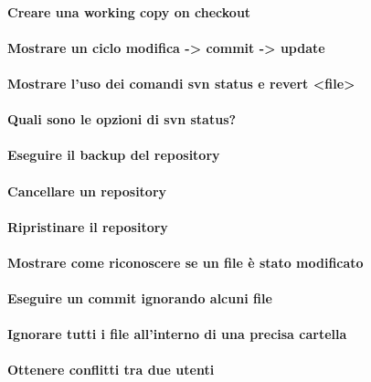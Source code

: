 \documentclass[a4paper]{article}
\begin{document}
	\paragraph{Creare una working copy on checkout}
	
	\paragraph{Mostrare un ciclo modifica -> commit -> update}
	
	\paragraph{Mostrare l'uso dei comandi svn status e revert <file>}
	
	\paragraph{Quali sono le opzioni di svn status?}
	
	\paragraph{Eseguire il backup del repository}
	
	\paragraph{Cancellare un repository}
	
	\paragraph{Ripristinare il repository}
	
	\paragraph{Mostrare come riconoscere se un file è stato modificato}
	
	\paragraph{Eseguire un commit ignorando alcuni file}
	
	\paragraph{Ignorare tutti i file all'interno di una precisa cartella}
	
	\paragraph{Ottenere conflitti tra due utenti}
	
\end{document}
